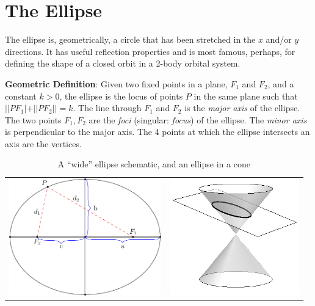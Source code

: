 \documentclass[11pt]{article}
\author{}
\date{}
\let\oldsection\section
\renewcommand{\section}[1]{\clearpage\oldsection{#1}}
\begin{document}
\hypertarget{the-ellipse}{%
\section{The Ellipse}\label{the-ellipse}}

The ellipse is, geometrically, a circle that has been stretched in the
\(x\) and/or \(y\) directions. It has useful reflection properties and
is most famous, perhaps, for defining the shape of a closed orbit in a
2-body orbital system.

\textbf{Geometric Definition}: Given two fixed points in a plane,
\(F_1\) and \(F_2\), and a constant \(k > 0\), the ellipse is the locus
of points \(P\) in the same plane such that \(||PF_1| + ||PF_2|| = k\).
The line through \(F_1\) and \(F_2\) is the \emph{major axis} of the
ellipse. The two points \(F_1,F_2\) are the \emph{foci} (singular:
\emph{focus}) of the ellipse. The \emph{minor axis} is perpendicular to
the major axis. The 4 points at which the ellipse intersects an axis are
the vertices.

\begin{table}[ht]
	\centering
	\begin{tabular}{cc}
		\includegraphics[width=\textwidth,height=2in]{ellipse-schematic.pdf} &
		\includegraphics[width=\textwidth,height=2in]{conic_ellipse.png}
	\end{tabular}
	\caption*{A ``wide'' ellipse schematic, and an ellipse in a cone}
\end{table}
\end{document}
